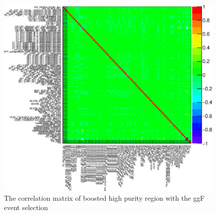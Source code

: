 \begin{figure}[!h]
	\includegraphics[width=1.0\textwidth]{Chapter4/CorrMatrix_WW_HP_ggF.eps}
	\begin{center}
		\caption{The correlation matrix of boosted high purity region with the ggF event selection}
		\label{Fig:Cor_HVT}
	\end{center}
\end{figure}
